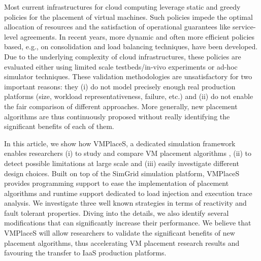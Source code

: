 
Most current infrastructures for cloud computing leverage static and
greedy policies for the placement of virtual machines. Such policies
impede the optimal allocation of resources and the satisfaction of
operational guarantees like service-level agreements. In recent years,
more dynamic and often more efficient policies based, e.g., on
consolidation and load balancing techniques, have been developed. Due
to the underlying complexity of cloud infrastructures, these policies
are evaluated either using limited scale testbeds/in-vivo experiments
or ad-hoc simulator techniques. These validation methodologies are
unsatisfactory for two important reasons: they (i) do not model
precisely enough real production platforms (size, workload
representativeness, failure, etc.) and (ii) do not enable the fair
comparison of different approaches. More generally, new placement
algorithms are thus continuously proposed without really identifying
the significant benefits of each of them.

In this article, we show how VMPlaceS, a dedicated simulation
framework enables researchers (i) to study and compare VM placement
algorithms , (ii) to detect possible limitations at large scale and
(iii) easily investigate different design choices. Built on top of the
SimGrid simulation platform, VMPlaceS provides programming support to
ease the implementation of placement algorithms and runtime support
dedicated to load injection and execution trace analysis. We
investigate three well known strategies in terms of
reactivity and fault tolerant properties. Diving into the details, we
also identify several modifications that can significantly increase
their performance. We believe that VMPlaceS will allow researchers to
validate the significant benefits of new placement algorithms, thus
accelerating VM placement research results and favouring the transfer
to IaaS production platforms.

